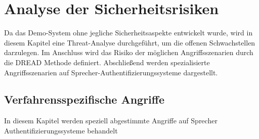 \section{Analyse der Sicherheitsrisiken}
Da das Demo-System ohne jegliche Sicherheitsaspekte entwickelt wurde, wird in diesem Kapitel eine Threat-Analyse durchgeführt, um die offenen Schwachstellen darzulegen.
Im Anschluss wird das Risiko der möglichen Angriffsszenarien durch die DREAD Methode definiert.
Abschließend werden spezialisierte Angriffsszenarien auf Sprecher-Authentifizierungssysteme dargestellt.

\subsection{Verfahrensspezifische Angriffe}
In diesem Kapitel werden speziell abgestimmte Angriffe auf Sprecher Authentifizierungssysteme behandelt
